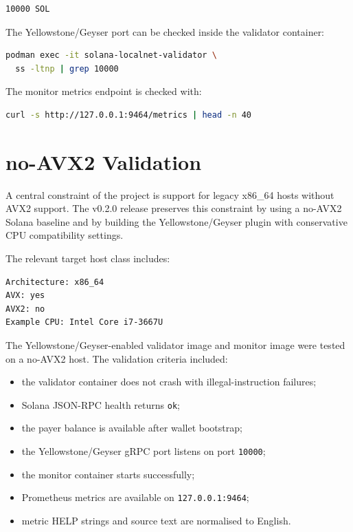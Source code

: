 \documentclass[11pt,a4paper]{article}
\begin{document}
\begin{lstlisting}
10000 SOL
\end{lstlisting}

The Yellowstone/Geyser port can be checked inside the validator container:

\begin{lstlisting}[language=bash]
podman exec -it solana-localnet-validator \
  ss -ltnp | grep 10000
\end{lstlisting}

The monitor metrics endpoint is checked with:

\begin{lstlisting}[language=bash]
curl -s http://127.0.0.1:9464/metrics | head -n 40
\end{lstlisting}

\section{no-AVX2 Validation}

A central constraint of the project is support for legacy x86\_64 hosts without AVX2 support. The v0.2.0 release preserves this constraint by using a no-AVX2 Solana baseline and by building the Yellowstone/Geyser plugin with conservative CPU compatibility settings.

The relevant target host class includes:

\begin{lstlisting}
Architecture: x86_64
AVX: yes
AVX2: no
Example CPU: Intel Core i7-3667U
\end{lstlisting}

The Yellowstone/Geyser-enabled validator image and monitor image were tested on a no-AVX2 host. The validation criteria included:

\begin{itemize}[leftmargin=2em]
  \item the validator container does not crash with illegal-instruction failures;
  \item Solana JSON-RPC health returns \texttt{ok};
  \item the payer balance is available after wallet bootstrap;
  \item the Yellowstone/Geyser gRPC port listens on port \texttt{10000};
  \item the monitor container starts successfully;
  \item Prometheus metrics are available on \texttt{127.0.0.1:9464};
  \item metric HELP strings and source text are normalised to English.
\end{itemize}
\end{document}
